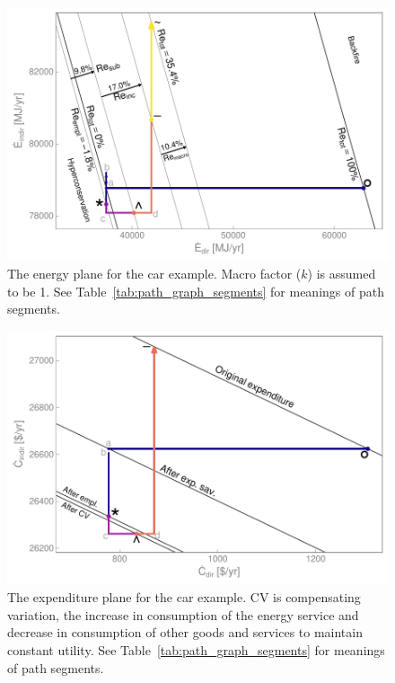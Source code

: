 \documentclass[12pt]{article}\usepackage[]{graphicx}\usepackage[]{xcolor}
\makeatletter
\def\maxwidth{ %
  \ifdim\Gin@nat@width>\linewidth
    \linewidth
  \else
    \Gin@nat@width
  \fi
}
\newenvironment{knitrout}{}{} %
\makeatother
\begin{document}
\begin{knitrout}
\color{fgcolor}\begin{figure}

{\centering \includegraphics[width=\maxwidth]{figure/CarEnergyGraph-1} 

}

\caption{The energy plane for the car example. Macro factor ($k$) is assumed to be 1. See Table~\ref{tab:path_graph_segments} for meanings of path segments.}\label{fig:CarEnergyGraph}
\end{figure}

\end{knitrout}


\begin{knitrout}
\color{fgcolor}\begin{figure}

{\centering \includegraphics[width=\maxwidth]{figure/CarCostGraph-1} 

}

\caption{The expenditure plane for the car example. CV is compensating variation, the increase in consumption of the energy service and decrease in consumption of other goods and services to maintain constant utility. See Table~\ref{tab:path_graph_segments} for meanings of path segments.}\label{fig:CarCostGraph}
\end{figure}

\end{knitrout}
\end{document}
